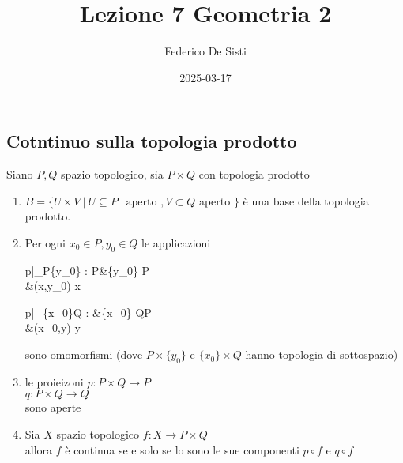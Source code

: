 \documentclass[12px]{article}
\title{Lezione 7 Geometria 2}
\date{2025-03-17}
\author{Federico De Sisti}
\begin{document}
	\maketitle
	\newpage
	\subsection{Cotntinuo sulla topologia prodotto}
	\begin{teo}
		Siano $P,Q$ spazio topologico, sia $P\times Q$ con topologia prodotto
		\begin{enumerate}
			\item $B = \{ U\times V \ | \ U\subseteq P\ \ \text{ aperto },  V\subset Q$ aperto  $\}$ è una base della topologia prodotto.
			\item Per ogni  $x_0\in P , y_0\in Q$ le applicazioni
				\begin{center}
					\begin{aligned}
						
						p|_{P\times \{y_0\}} : P&\times\{y_0\} \rightarrow P\\
									&(x,y_0) \rightarrow x
					\end{aligned}
				\end{center}
				\begin{center}
					\begin{aligned}
						
						p|_{\{x_0\}\times Q} : &\{x_0\} \times Q\rightarrow P\\
									&(x_0,y) \rightarrow y
					\end{aligned}
				\end{center}
				sono omomorfismi (dove $P\times\{y_0\}$ e $\{x_0\}\times Q$  hanno topologia di sottospazio)\\
			\item le proieizoni $p : P\times Q \rightarrow P$\\
				$q: P\times Q \rightarrow Q$\\
				sono aperte
			\item Sia $X$ spazio topologico $f : X \rightarrow P\times Q$\\
				allora $f$ è continua se e solo se lo sono le sue componenti $p\circ f $ e $q\circ f$
		\end{enumerate}
	\end{teo}
\end{document}
